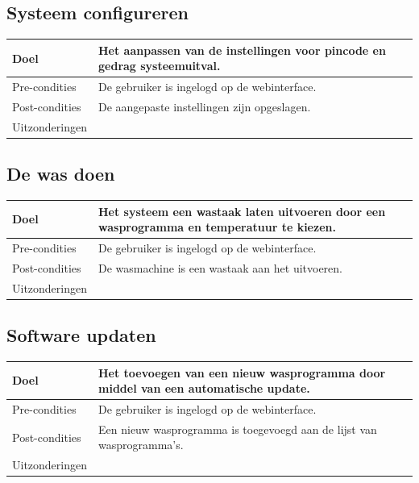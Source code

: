 \subsection{Systeem configureren}
\begin{center}
  \begin{tabular}{ | p{4cm} | p{8.5cm} | }    \hline
    Doel & Het aanpassen van de instellingen voor pincode en gedrag systeemuitval. \\ \hline
    Pre-condities & De gebruiker is ingelogd op de webinterface. \\ \hline
    Post-condities & De aangepaste instellingen zijn opgeslagen. \\ \hline
    Uitzonderingen & \\
    \hline
  \end{tabular}
\end{center}

\subsection{De was doen}
\begin{center}
  \begin{tabular}{ | p{4cm} | p{8.5cm} | }    \hline
    Doel & Het systeem een wastaak laten uitvoeren door een wasprogramma en temperatuur te kiezen. \\ \hline
    Pre-condities & De gebruiker is ingelogd op de webinterface. \\ \hline
    Post-condities & De wasmachine is een wastaak aan het uitvoeren. \\ \hline
    Uitzonderingen & \\
    \hline
  \end{tabular}
\end{center}

\subsection{Software updaten}
\begin{center}
  \begin{tabular}{ | p{4cm} | p{8.5cm} | }    \hline
    Doel & Het toevoegen van een nieuw wasprogramma door middel van een automatische update. \\ \hline
    Pre-condities & De gebruiker is ingelogd op de webinterface. \\ \hline
    Post-condities & Een nieuw wasprogramma is toegevoegd aan de lijst van wasprogramma's. \\ \hline
    Uitzonderingen & \\
    \hline
  \end{tabular}
\end{center}

